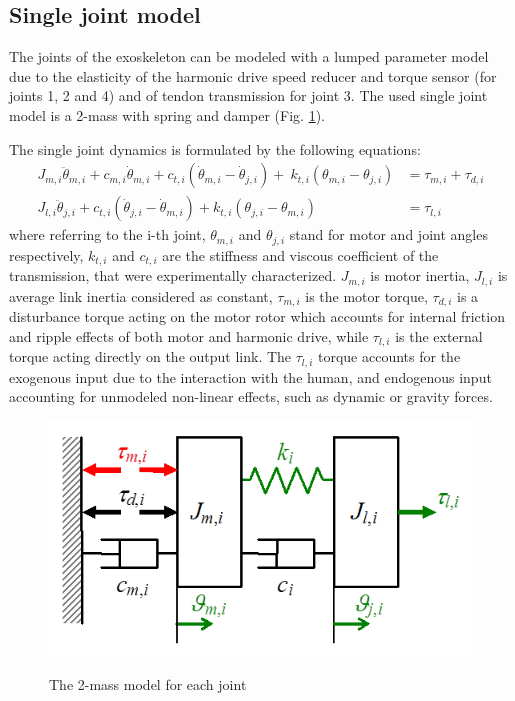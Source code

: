 \documentclass[journal]{IEEEtran}
\newcommand{\hldone}[1]{\colorbox{green}{#1}}
\begin{document}
\subsection{Single joint model} \label{Single joint model}
The joints of the exoskeleton can be modeled with a lumped parameter model due to the elasticity of the harmonic drive speed reducer and torque sensor (for joints 1, 2 and 4) and of tendon transmission for joint 3. The used single joint model is a 2-mass with spring and damper (Fig. \ref{fig:exos_singlejoint_model}).
\par The single joint dynamics is formulated by the following equations:
\setlength{\arraycolsep}{0.0em}
\footnotesize
\begin{align}
J_{m,i} \ddot{\theta}_{m,i}  + c_{m,i}\dot{\theta}_{m,i} + c_{t,i} (\dot{\theta}_{m,i}-\dot{\theta}_{j,i})  
{+}\:k_{t,i} ({\theta_{m,i}}-{\theta_{j,i}}) &= \tau_{m,i}+\tau_ {d,i} \nonumber	\\
\label{eqn:dinamicaLinkSingoloGiunto}
J_{l,i} \ddot{\theta}_{j,i}+c_{t,i} (\dot{\theta}_{j,i}-\dot{\theta}_{m,i})
+k_{t,i} ({\theta_{j,i}}-{\theta_{m,i}}) &= \tau_{l,i}	
\end{align}
\normalsize
\setlength{\arraycolsep}{5pt}
where referring to the i-th joint, $\theta_ {m,i}$ and $\theta_ {j,i}$ stand for motor and joint angles respectively, $k_{t,i}$ and $c_{t,i}$ are the stiffness and viscous coefficient of the transmission, that were experimentally characterized.
$J_{m,i}$ is motor inertia, $J_{l,i}$ is average link inertia considered as constant, $\tau_{m,i}$ is the motor torque, $\tau_{d,i}$ is a disturbance torque acting on the motor rotor  which accounts for internal friction and ripple effects of both motor and harmonic drive, while $\tau_{l,i}$ is the external torque acting directly on the output link. The $\tau_{l,i}$ torque accounts for the 
exogenous input due to the interaction  with the human, and endogenous input accounting for unmodeled non-linear effects, such as dynamic or gravity forces.
\begin{figure}[ht]
	\centering
	{\includegraphics[width=0.5\columnwidth]{2massModel}}
	\caption{The 2-mass model for each joint}
	\label{fig:exos_singlejoint_model}
\end{figure}
\end{document}
